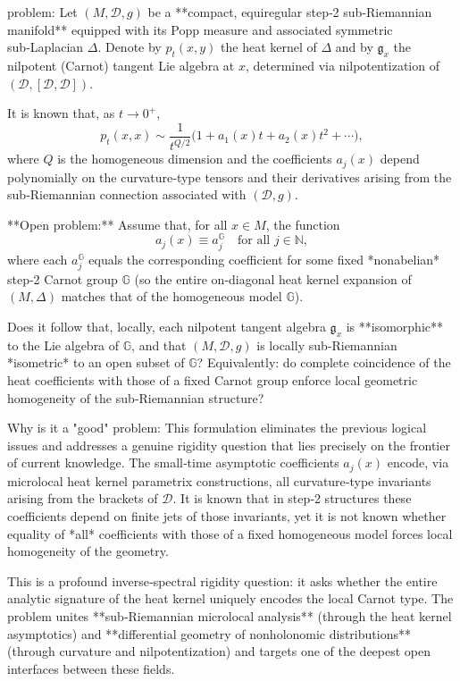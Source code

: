 problem:  
Let \((M,\mathcal{D},g)\) be a **compact, equiregular step‑2 sub‑Riemannian manifold** equipped with its Popp measure and associated symmetric sub‑Laplacian \(\Delta\). Denote by \(p_t(x,y)\) the heat kernel of \(\Delta\) and by \(\mathfrak{g}_x\) the nilpotent (Carnot) tangent Lie algebra at \(x\), determined via nilpotentization of \((\mathcal{D},[\mathcal{D},\mathcal{D}])\).  

It is known that, as \(t\to0^+\),
\[
p_t(x,x)\sim \frac{1}{t^{Q/2}}\big(1+a_1(x)t+a_2(x)t^2+\cdots\big),
\]
where \(Q\) is the homogeneous dimension and the coefficients \(a_j(x)\) depend polynomially on the curvature‑type tensors and their derivatives arising from the sub‑Riemannian connection associated with \((\mathcal{D},g)\).  

**Open problem:**  
Assume that, for all \(x\in M\), the function
\[
a_j(x)\equiv a_j^{\mathbb{G}}\quad\text{for all } j\in\mathbb{N},
\]
where each \(a_j^{\mathbb{G}}\) equals the corresponding coefficient for some fixed *nonabelian* step‑2 Carnot group \(\mathbb{G}\) (so the entire on‑diagonal heat kernel expansion of \((M,\Delta)\) matches that of the homogeneous model \(\mathbb{G}\)).  

Does it follow that, locally, each nilpotent tangent algebra \(\mathfrak{g}_x\) is **isomorphic** to the Lie algebra of \(\mathbb{G}\), and that \((M,\mathcal{D},g)\) is locally sub‑Riemannian *isometric* to an open subset of \(\mathbb{G}\)?  
Equivalently: do complete coincidence of the heat coefficients with those of a fixed Carnot group enforce local geometric homogeneity of the sub‑Riemannian structure?

Why is it a "good" problem:  
This formulation eliminates the previous logical issues and addresses a genuine rigidity question that lies precisely on the frontier of current knowledge. The small‑time asymptotic coefficients \(a_j(x)\) encode, via microlocal heat kernel parametrix constructions, all curvature‑type invariants arising from the brackets of \(\mathcal{D}\). It is known that in step‑2 structures these coefficients depend on finite jets of those invariants, yet it is not known whether equality of *all* coefficients with those of a fixed homogeneous model forces local homogeneity of the geometry.  

This is a profound inverse‑spectral rigidity question: it asks whether the entire analytic signature of the heat kernel uniquely encodes the local Carnot type. The problem unites **sub‑Riemannian microlocal analysis** (through the heat kernel asymptotics) and **differential geometry of nonholonomic distributions** (through curvature and nilpotentization) and targets one of the deepest open interfaces between these fields.  

